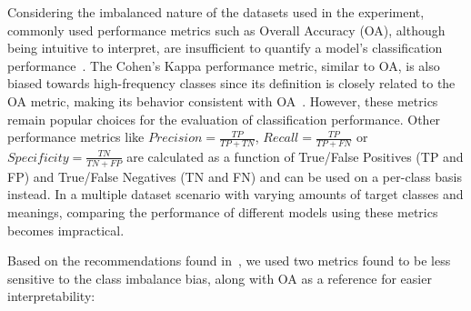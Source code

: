 \documentclass[10pt,journal,compsoc]{IEEEtran}
\begin{document}
Considering the imbalanced nature of the datasets used in the experiment,
commonly used performance metrics such as Overall Accuracy (OA), although
being intuitive to interpret, are insufficient to quantify a model's
classification performance~\cite{Jeni2013}. The Cohen's Kappa performance
metric, similar to OA, is also biased towards high-frequency classes since its
definition is closely related to the OA metric, making its behavior consistent
with OA~\cite{Fatourechi2008}. However, these metrics remain popular choices
for the evaluation of classification performance. Other performance metrics
like $Precision = \frac{TP}{TP+TN}$, $Recall = \frac{TP}{TP+FN}$ or
$Specificity = \frac{TN}{TN + FP}$ are calculated as a function of True/False
Positives (TP and FP) and True/False Negatives (TN and FN) and can be used on
a per-class basis instead. In a multiple dataset scenario with varying amounts
of target classes and meanings, comparing the performance of different models
using these metrics becomes impractical.
 
Based on the recommendations found in~\cite{Jeni2013, Kubat1997}, we used two
metrics found to be less sensitive to the class imbalance bias, along with OA
as a reference for easier interpretability:
\end{document}
